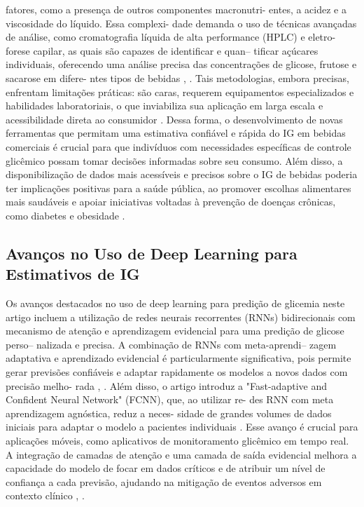 \documentclass[conference]{IEEEtran}
\begin{document}
fatores, como a presença de outros componentes macronutri-
entes, a acidez e a viscosidade do líquido. Essa complexi-
dade demanda o uso de técnicas avançadas de análise, como 
cromatografia líquida de alta performance (HPLC) e eletro-
forese capilar, as quais são capazes de identificar e quan--
tificar açúcares individuais, oferecendo uma análise precisa 
das concentrações de glicose, frutose e sacarose em difere-
ntes tipos de bebidas \cite{b40}, \cite{b41}. Tais metodologias, embora 
precisas, enfrentam limitações práticas: são caras, requerem 
equipamentos especializados e habilidades laboratoriais, o que 
inviabiliza sua aplicação em larga escala e acessibilidade direta 
ao consumidor \cite{b42}. Dessa forma, o desenvolvimento de novas
ferramentas que permitam uma estimativa confiável e rápida
do IG em bebidas comerciais é crucial para que indivíduos 
com necessidades específicas de controle glicêmico possam 
tomar decisões informadas sobre seu consumo. Além disso, a 
disponibilização de dados mais acessíveis e precisos sobre o 
IG de bebidas poderia ter implicações positivas para a saúde 
pública, ao promover escolhas alimentares mais saudáveis e 
apoiar iniciativas voltadas à prevenção de doenças crônicas, 
como diabetes e obesidade \cite{b43}.
\fussy

\subsection{Avanços no Uso de Deep Learning para Estimativos de IG}
\sloppy
Os avanços destacados no uso de deep learning para predição 
de glicemia neste artigo incluem a utilização de redes neurais
recorrentes (RNNs) bidirecionais com mecanismo de atenção e 
aprendizagem evidencial para uma predição de glicose perso--
nalizada e precisa. A combinação de RNNs com meta-aprendi--
zagem adaptativa e aprendizado evidencial é particularmente
significativa, pois permite gerar previsões confiáveis e adaptar 
rapidamente os modelos a novos dados com precisão melho-
rada \cite{b34}, \cite{b35}. Além disso, o artigo introduz a "Fast-adaptive 
and Confident Neural Network" (FCNN), que, ao utilizar re-
des RNN com meta aprendizagem agnóstica, reduz a neces-
sidade de grandes volumes de dados iniciais para adaptar o 
modelo a pacientes individuais \cite{b36}. Esse avanço é crucial 
para aplicações móveis, como aplicativos de monitoramento 
glicêmico em tempo real. A integração de camadas de atenção 
e uma camada de saída evidencial melhora a capacidade do 
modelo de focar em dados críticos e de atribuir um nível de 
confiança a cada previsão, ajudando na mitigação de eventos 
adversos em contexto clínico \cite{b33}, \cite{b34}.
\fussy
\end{document}
